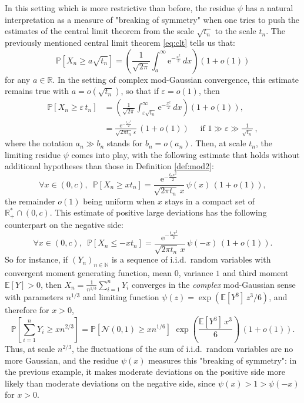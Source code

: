 \documentclass[12pt,a4paper,reqno]{amsart}
\newcommand{\N}{\mathbb{N}}
\newcommand{\R}{\mathbb{R}}
\newcommand{\E}{\mathrm{e}}
\newcommand{\esper}{\mathbb{E}}
\newcommand{\proba}{\mathbb{P}}
\newcommand{\eps}{\varepsilon}
\theoremstyle{remark}
\begin{document}
In this setting which is more restrictive than before, the residue $\psi$ has a natural interpretation as a measure of "breaking of symmetry" when one tries to push the estimates of the central limit theorem from the scale $\sqrt{t_n}$ to the scale $t_n$. The previously mentioned central limit theorem \eqref{eq:clt} tells us that:
$$\proba\!\left[ X_n \geq a\sqrt{t_n}\right] = \left(\frac{1}{\sqrt{2\pi}} \int_{a}^\infty \E^{-\frac{x^2}{2}}\,dx \right)(1+o(1))$$
for any $a \in \R$. In the setting of complex mod-Gaussian convergence, this estimate remains true with $a=o(\sqrt{t_n})$, so that if $\eps=o(1)$, then
\begin{align*}\proba\left[ X_n \geq \eps\, t_n\right] &=\left(\frac{1}{\sqrt{2\pi}} \int_{\eps \sqrt{t_n}}^\infty \E^{-\frac{x^2}{2}}\,dx \right)(1+o(1)),\\
&=\frac{\E^{-\frac{t_n \eps^2}{2}}}{\sqrt{2\pi t_n} \,\eps}\,(1+o(1))\quad\text{ if }1 \gg \eps \gg \frac{1}{\sqrt{t_n}}\,,
\end{align*}where the notation $a_n \gg b_n$ stands for $b_n=o(a_n)$.
Then, at scale $t_n$, the limiting residue $\psi$ comes into play, with the following estimate that holds without additional hypotheses than those in Definition \ref{def:mod2}:
\begin{equation}\forall x \in (0,c),\,\,\,\proba[X_n \geq xt_n] = \frac{\E^{-\frac{t_n x^2}{2}}}{\sqrt{2\pi t_n} \,x}\,\psi(x)\,(1+o(1)),
\label{eq:upbound}
\end{equation}
the remainder $o(1)$ being uniform when $x$ stays in a compact set of $\R_+^*\cap(0,c)$. This estimate of positive large deviations has the following counterpart on the negative side:
$$\forall x  \in (0,c),\,\,\,\proba[X_n \leq -xt_n] = \frac{\E^{-\frac{t_n x^2}{2}}}{\sqrt{2\pi t_n} \,x}\,\psi(-x)\,(1+o(1)).$$
So for instance, if $(Y_n)_{n \in \N}$ is a sequence of i.i.d.~random variables with convergent moment generating function, mean $0$, variance $1$ and third moment $\esper[Y]>0$, then $X_n=\frac{1}{n^{1/3}}\sum_{i=1}^n Y_i$ converges in the \emph{complex} mod-Gaussian sense with parameters $n^{1/3}$ and limiting function $\psi(z)=\exp(\esper[Y^3]\,z^3/6)$, and therefore for $x>0$,
$$\proba\!\left[\sum_{i=1}^n Y_i \geq xn^{2/3}\right] = \proba\!\left[\mathcal{N}(0,1)\geq xn^{1/6}\right]\,\,\exp\!\left(\frac{\esper[Y^3]\,x^3}{6}\right)\,(1+o(1)).$$
Thus, at scale $n^{2/3}$, the fluctuations of the sum of i.i.d.~random variables are no more Gaussian, and the residue $\psi(x)$ measures this "breaking of symmetry": in the previous example, it makes moderate deviations on the positive side more likely than moderate deviations on the negative side, since $\psi(x)>1>\psi(-x)$ for $x>0$. \bigskip
\end{document}
